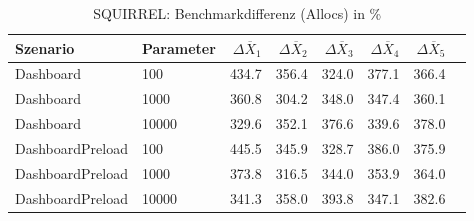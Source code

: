 
\begin{table}[ht]
\setlength{\extrarowheight}{-1pt}
\centering
\caption{SQUIRREL: Benchmarkdifferenz (Allocs) in \%}
\begin{tabular}{llrrrrrr}
\toprule
Szenario & Parameter & ${\Delta \overline{X}_1}$ & ${\Delta \overline{X}_2}$ & ${\Delta \overline{X}_3}$ & ${\Delta \overline{X}_4}$ & ${\Delta \overline{X}_5}$ \\
\midrule
	Dashboard & 100 & \cellcolor{red!30}  434.7 & \cellcolor{red!30}  356.4 & \cellcolor{red!30}  324.0 & \cellcolor{red!30}  377.1 & \cellcolor{red!30}  366.4 \\
	Dashboard & 1000 & \cellcolor{red!30}  360.8 & \cellcolor{red!30}  304.2 & \cellcolor{red!30}  348.0 & \cellcolor{red!30}  347.4 & \cellcolor{red!30}  360.1 \\
	Dashboard & 10000 & \cellcolor{red!30}  329.6 & \cellcolor{red!30}  352.1 & \cellcolor{red!30}  376.6 & \cellcolor{red!30}  339.6 & \cellcolor{red!30}  378.0 \\
	DashboardPreload & 100 & \cellcolor{red!30}  445.5 & \cellcolor{red!30}  345.9 & \cellcolor{red!30}  328.7 & \cellcolor{red!30}  386.0 & \cellcolor{red!30}  375.9 \\
	DashboardPreload & 1000 & \cellcolor{red!30}  373.8 & \cellcolor{red!30}  316.5 & \cellcolor{red!30}  344.0 & \cellcolor{red!30}  353.9 & \cellcolor{red!30}  364.0 \\
	DashboardPreload & 10000 & \cellcolor{red!30}  341.3 & \cellcolor{red!30}  358.0 & \cellcolor{red!30}  393.8 & \cellcolor{red!30}  347.1 & \cellcolor{red!30}  382.6 \\
\bottomrule
\end{tabular}
\label{tab:benchmarkdifferenz_squirrel_allocs}
\end{table}
	